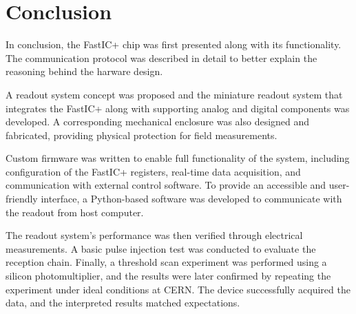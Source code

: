 \documentclass[twoside]{ctuthesis}
\theoremstyle{plain}
\theoremstyle{definition}
\theoremstyle{note}
\begin{document}
\chapter{Conclusion}
In conclusion, the FastIC+ chip was first presented along with its functionality. The communication protocol was described in detail to better explain the reasoning behind the harware design.

A readout system concept was proposed and the miniature readout system that integrates the FastIC+ along with supporting analog and digital components was developed. A corresponding mechanical enclosure was also designed and fabricated, providing physical protection for field measurements.

Custom firmware was written to enable full functionality of the system, including configuration of the FastIC+ registers, real-time data acquisition, and communication with external control software. To provide an accessible and user-friendly interface, a Python-based software was developed to communicate with the readout from host computer.

The readout system's performance was then verified through electrical measurements. A basic pulse injection test was conducted to evaluate the reception chain. Finally, a threshold scan experiment was performed using a silicon photomultiplier, and the results were later confirmed by repeating the experiment under ideal conditions at CERN. The device successfully acquired the data, and the interpreted results matched expectations.


\clearpage
\FloatBarrier
\printbibliography
\newpage
\end{document}

